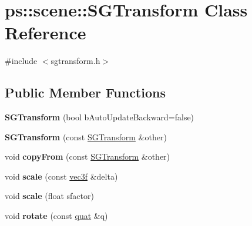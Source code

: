 \hypertarget{classps_1_1scene_1_1SGTransform}{}\section{ps\+:\+:scene\+:\+:S\+G\+Transform Class Reference}
\label{classps_1_1scene_1_1SGTransform}


{\ttfamily \#include $<$sgtransform.\+h$>$}

\subsection*{Public Member Functions}
\begin{DoxyCompactItemize}
\item 
\hypertarget{classps_1_1scene_1_1SGTransform_afaf5a87138dabd0aacac5545bfbcd2d2}{}{\bfseries S\+G\+Transform} (bool b\+Auto\+Update\+Backward=false)\label{classps_1_1scene_1_1SGTransform_afaf5a87138dabd0aacac5545bfbcd2d2}

\item 
\hypertarget{classps_1_1scene_1_1SGTransform_a7726860818c1d0f69ffae1bf198a82f7}{}{\bfseries S\+G\+Transform} (const \hyperlink{classps_1_1scene_1_1SGTransform}{S\+G\+Transform} \&other)\label{classps_1_1scene_1_1SGTransform_a7726860818c1d0f69ffae1bf198a82f7}

\item 
\hypertarget{classps_1_1scene_1_1SGTransform_a8d45f9b4735efffbd076d40c79a78e7a}{}void {\bfseries copy\+From} (const \hyperlink{classps_1_1scene_1_1SGTransform}{S\+G\+Transform} \&other)\label{classps_1_1scene_1_1SGTransform_a8d45f9b4735efffbd076d40c79a78e7a}

\item 
\hypertarget{classps_1_1scene_1_1SGTransform_adb066652059d4045d722fc6f61c6b87a}{}void {\bfseries scale} (const \hyperlink{classps_1_1base_1_1Vec3}{vec3f} \&delta)\label{classps_1_1scene_1_1SGTransform_adb066652059d4045d722fc6f61c6b87a}

\item 
\hypertarget{classps_1_1scene_1_1SGTransform_aebad2680e9d8a356231721515e865201}{}void {\bfseries scale} (float sfactor)\label{classps_1_1scene_1_1SGTransform_aebad2680e9d8a356231721515e865201}

\item 
\hypertarget{classps_1_1scene_1_1SGTransform_a0875af7b739cec704217e420cfcf502d}{}void {\bfseries rotate} (const \hyperlink{classps_1_1base_1_1Quaternion}{quat} \&q)\label{classps_1_1scene_1_1SGTransform_a0875af7b739cec704217e420cfcf502d}


\end{DoxyCompactItemize}

